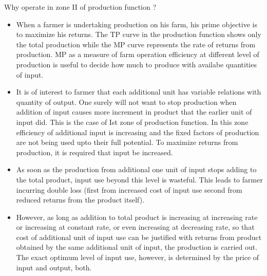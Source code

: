 \documentclass[12pt,ignorenonframetext,aspectratio=169]{beamer}
\begin{document}
\begin{frame}{Why operate in zone II of production function ?}
\protect\hypertarget{why-operate-in-zone-ii-of-production-function}{}
\begin{itemize}
\item
  When a farmer is undertaking production on his farm, his prime
  objective is to maximize his returns. The TP curve in the production
  function shows only the total production while the MP curve represents
  the rate of returns from production. MP as a measure of farm operation
  efficiency at different level of production is useful to decide how
  much to produce with availabe quantities of input.
\item
  It is of interest to farmer that each additional unit has variable
  relations with quantity of output. One surely will not want to stop
  production when addition of input causes more increment in product
  that the earlier unit of input did. This is the case of Ist zone of
  production function. In this zone efficiency of additional input is
  increasing and the fixed factors of production are not being used upto
  their full potential. To maximize returns from production, it is
  required that input be increased.
\end{itemize}
\end{frame}

\begin{frame}{}
\protect\hypertarget{section-13}{}
\begin{itemize}
\item
  As soon as the production from additional one unit of input stops
  adding to the total product, input use beyond this level is wasteful.
  This leads to farmer incurring double loss (first from increased cost
  of input use second from reduced returns from the product itself).
\item
  However, as long as addition to total product is increasing at
  increasing rate or increasing at constant rate, or even increasing at
  decreasing rate, so that cost of additional unit of input use can be
  justified with returns from product obtained by the same additional
  unit of input, the production is carried out. The exact optimum level
  of input use, however, is determined by the price of input and output,
  both.
\end{itemize}
\end{frame}
\end{document}
